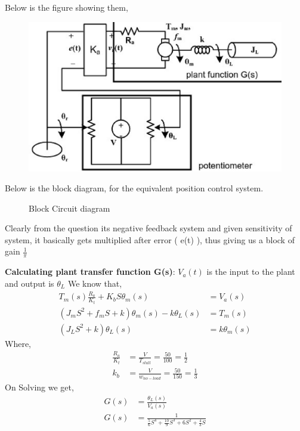 \begin{enumerate}[label=\thesection.\arabic*.,ref=\thesection.\theenumi]
Below is the figure showing them,\newline
\begin{figure}[!ht]
    \includegraphics[width=\columnwidth]{./figs/ee18btech11019_3.eps}
  \caption{}
  \label{fig:ee18btech11019_fig3}
\end{figure}
Below is the block diagram, for the equivalent position control system.\newline
\begin{figure}[!ht]
    \begin{center}
		
		\resizebox{\columnwidth}{!}{}
	\end{center}
\caption{Block Circuit diagram}
\label{fig:circuit_diagram}
\end{figure}
Clearly from the question its negative feedback system and given sensitivity of system, it basically gets multiplied after error ( e(t) ), thus giving us a block of gain $\frac{1}{\pi}$\newline

\textbf{Calculating plant transfer function G(s)}:\newline\newline
$V_a(t)$ is the input to the plant and output is $\theta_L$\newline
We know that,\newline
\begin{align}
    T_m(s)\frac{R_a}{K_t} + K_bS\theta_m(s)  &=  V_a(s)\\
    (J_mS^2 + f_mS + k)\theta_m(s) - k\theta_L(s)  &=  T_m(s) \\
   (J_LS^2 + k)\theta_L(s)  &=  k\theta_m(s)
\end{align}
Where, \newline
\begin{align}
    \frac{R_a}{K_t} &= \frac{V}{T_{stall}} = \frac{50}{100} = \frac{1}{2}\\
    k_b &= \frac{V}{w_{no-load}} = \frac{50}{150} = \frac{1}{3}
\end{align}
On Solving we get,\newline
\begin{align}
G(s) &= \frac{\theta_L(s)}{V_a(s)}\\
G(s) &= \frac{1}{\frac{5}{6}S^4 + \frac{10}{9}S^3 + 6S^2 + \frac{4}{3}S}
\end{align}



\end{enumerate}
